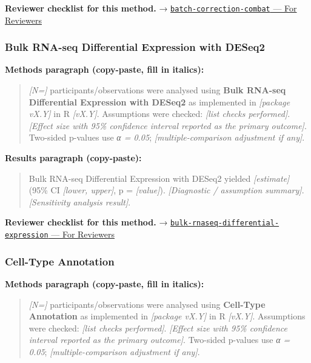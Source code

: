 \documentclass[
]{article}
\begin{document}
\textbf{Reviewer checklist for this method.} →
\href{../chapters/12-bioinformatics/batch-correction-combat.Rmd\#for-reviewers}{\texttt{batch-correction-combat}
--- For Reviewers}

\subsubsection{Bulk RNA-seq Differential Expression with
DESeq2}\label{bulk-rna-seq-differential-expression-with-deseq2}

\textbf{Methods paragraph (copy-paste, fill in italics):}

\begin{quote}
\emph{{[}N={]}} participants/observations were analysed using
\textbf{Bulk RNA-seq Differential Expression with DESeq2} as implemented
in \emph{{[}package vX.Y{]}} in R \emph{{[}vX.Y{]}}. Assumptions were
checked: \emph{{[}list checks performed{]}}. \emph{{[}Effect size with
95\% confidence interval reported as the primary outcome{]}}. Two-sided
p-values use \emph{α = 0.05}; \emph{{[}multiple-comparison adjustment if
any{]}}.
\end{quote}

\textbf{Results paragraph (copy-paste):}

\begin{quote}
Bulk RNA-seq Differential Expression with DESeq2 yielded
\emph{{[}estimate{]}} (95\% CI \emph{{[}lower, upper{]}}, p =
\emph{{[}value{]}}). \emph{{[}Diagnostic / assumption summary{]}}.
\emph{{[}Sensitivity analysis result{]}}.
\end{quote}

\textbf{Reviewer checklist for this method.} →
\href{../chapters/12-bioinformatics/bulk-rnaseq-differential-expression.Rmd\#for-reviewers}{\texttt{bulk-rnaseq-differential-expression}
--- For Reviewers}

\subsubsection{Cell-Type Annotation}\label{cell-type-annotation}

\textbf{Methods paragraph (copy-paste, fill in italics):}

\begin{quote}
\emph{{[}N={]}} participants/observations were analysed using
\textbf{Cell-Type Annotation} as implemented in \emph{{[}package
vX.Y{]}} in R \emph{{[}vX.Y{]}}. Assumptions were checked: \emph{{[}list
checks performed{]}}. \emph{{[}Effect size with 95\% confidence interval
reported as the primary outcome{]}}. Two-sided p-values use \emph{α =
0.05}; \emph{{[}multiple-comparison adjustment if any{]}}.
\end{quote}
\end{document}
